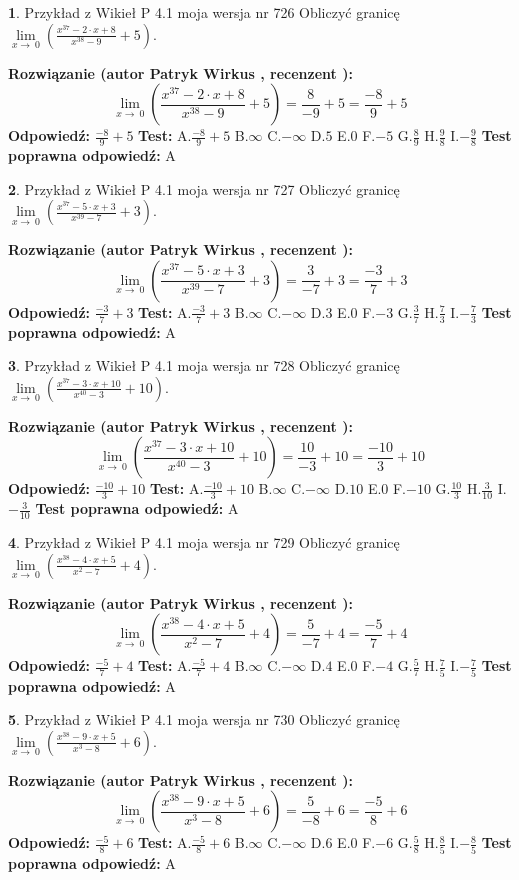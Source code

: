 \documentclass[12pt, a4paper]{article}
\theoremstyle{definition} %
\newtheorem{zad}{}
\newcommand{\zadStart}[1]{\begin{zad}#1\newline}
\newcommand{\zadStop}{\end{zad}}
\newcommand{\rozwStart}[2]{\noindent \textbf{Rozwiązanie (autor #1 , recenzent #2): }\newline}
\newcommand{\rozwStop}{\newline}
\newcommand{\odpStart}{\noindent \textbf{Odpowiedź:}\newline}
\newcommand{\odpStop}{\newline}
\newcommand{\testStart}{\noindent \textbf{Test:}\newline}
\newcommand{\testStop}{\newline}
\newcommand{\kluczStart}{\noindent \textbf{Test poprawna odpowiedź:}\newline}
\newcommand{\kluczStop}{\newline}
\begin{document}
\zadStart{Przykład z Wikieł P 4.1 moja wersja nr 726}
Obliczyć granicę $\lim\limits_{x\to\ 0}(\frac{x^{37}-2 \cdot x +8}{x^{38}-9}+5)$.
\zadStop
\rozwStart{Patryk Wirkus}{}
$$\lim\limits_{x\to\ 0}(\frac{x^{37}-2 \cdot x +8}{x^{38}-9}+5)=\frac{8}{-9}+5=\frac{-8}{9}+5$$
\rozwStop
\odpStart
$\frac{-8}{9}+5$
\odpStop
\testStart
A.$\frac{-8}{9}+5$
B.$\infty$
C.$-\infty$
D.$5$
E.$0$
F.$-5$
G.$\frac{8}{9}$
H.$\frac{9}{8}$
I.$-\frac{9}{8}$
\testStop
\kluczStart
A
\kluczStop



\zadStart{Przykład z Wikieł P 4.1 moja wersja nr 727}
Obliczyć granicę $\lim\limits_{x\to\ 0}(\frac{x^{37}-5 \cdot x +3}{x^{39}-7}+3)$.
\zadStop
\rozwStart{Patryk Wirkus}{}
$$\lim\limits_{x\to\ 0}(\frac{x^{37}-5 \cdot x +3}{x^{39}-7}+3)=\frac{3}{-7}+3=\frac{-3}{7}+3$$
\rozwStop
\odpStart
$\frac{-3}{7}+3$
\odpStop
\testStart
A.$\frac{-3}{7}+3$
B.$\infty$
C.$-\infty$
D.$3$
E.$0$
F.$-3$
G.$\frac{3}{7}$
H.$\frac{7}{3}$
I.$-\frac{7}{3}$
\testStop
\kluczStart
A
\kluczStop



\zadStart{Przykład z Wikieł P 4.1 moja wersja nr 728}
Obliczyć granicę $\lim\limits_{x\to\ 0}(\frac{x^{37}-3 \cdot x +10}{x^{40}-3}+10)$.
\zadStop
\rozwStart{Patryk Wirkus}{}
$$\lim\limits_{x\to\ 0}(\frac{x^{37}-3 \cdot x +10}{x^{40}-3}+10)=\frac{10}{-3}+10=\frac{-10}{3}+10$$
\rozwStop
\odpStart
$\frac{-10}{3}+10$
\odpStop
\testStart
A.$\frac{-10}{3}+10$
B.$\infty$
C.$-\infty$
D.$10$
E.$0$
F.$-10$
G.$\frac{10}{3}$
H.$\frac{3}{10}$
I.$-\frac{3}{10}$
\testStop
\kluczStart
A
\kluczStop



\zadStart{Przykład z Wikieł P 4.1 moja wersja nr 729}
Obliczyć granicę $\lim\limits_{x\to\ 0}(\frac{x^{38}-4 \cdot x +5}{x^{2}-7}+4)$.
\zadStop
\rozwStart{Patryk Wirkus}{}
$$\lim\limits_{x\to\ 0}(\frac{x^{38}-4 \cdot x +5}{x^{2}-7}+4)=\frac{5}{-7}+4=\frac{-5}{7}+4$$
\rozwStop
\odpStart
$\frac{-5}{7}+4$
\odpStop
\testStart
A.$\frac{-5}{7}+4$
B.$\infty$
C.$-\infty$
D.$4$
E.$0$
F.$-4$
G.$\frac{5}{7}$
H.$\frac{7}{5}$
I.$-\frac{7}{5}$
\testStop
\kluczStart
A
\kluczStop



\zadStart{Przykład z Wikieł P 4.1 moja wersja nr 730}
Obliczyć granicę $\lim\limits_{x\to\ 0}(\frac{x^{38}-9 \cdot x +5}{x^{3}-8}+6)$.
\zadStop
\rozwStart{Patryk Wirkus}{}
$$\lim\limits_{x\to\ 0}(\frac{x^{38}-9 \cdot x +5}{x^{3}-8}+6)=\frac{5}{-8}+6=\frac{-5}{8}+6$$
\rozwStop
\odpStart
$\frac{-5}{8}+6$
\odpStop
\testStart
A.$\frac{-5}{8}+6$
B.$\infty$
C.$-\infty$
D.$6$
E.$0$
F.$-6$
G.$\frac{5}{8}$
H.$\frac{8}{5}$
I.$-\frac{8}{5}$
\testStop
\kluczStart
A
\kluczStop
\end{document}
